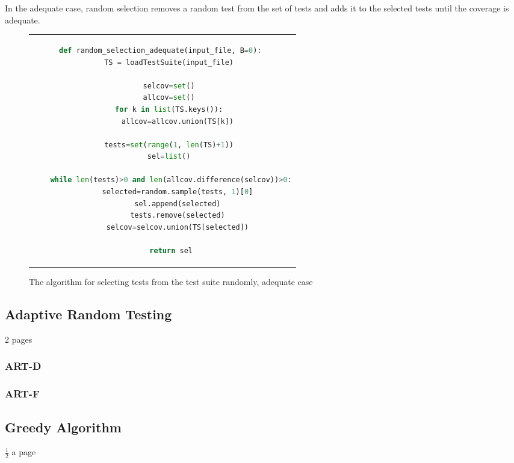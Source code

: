 In the adequate case, random selection removes a random test from the set
of tests and adds it to the selected tests until the coverage is adequate.

\begin{figure}[htpb]
\centering
\begin{tabular}{c}
\begin{lstlisting}[language=python]
def random_selection_adequate(input_file, B=0): 
	TS = loadTestSuite(input_file) 

	selcov=set() 
	allcov=set() 
	for k in list(TS.keys()): 
		allcov=allcov.union(TS[k]) 

	tests=set(range(1, len(TS)+1)) 
	sel=list() 

	while len(tests)>0 and len(allcov.difference(selcov))>0:
		selected=random.sample(tests, 1)[0] 
		sel.append(selected) 
		tests.remove(selected) 
		selcov=selcov.union(TS[selected]) 

	return sel
\end{lstlisting}
\end{tabular}
\caption[Random adequate selection]{The algorithm for selecting tests from the test suite randomly, adequate case}\label{fig:random-adequate-listing}
\end{figure}

\subsection{Adaptive Random Testing}

2 pages

\subsubsection{ART-D}

\subsubsection{ART-F}

\subsection{Greedy Algorithm}

$\frac{1}{2}$ a page
